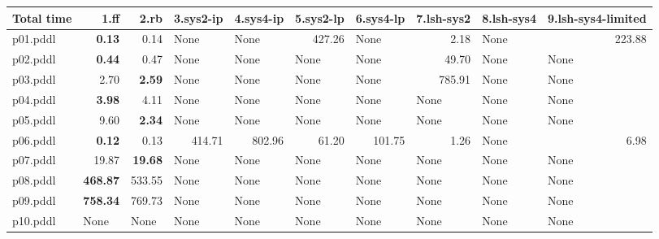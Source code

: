 \documentclass{article}
\begin{document}
\begin{tabular}{@{}lrrrrrrrrr@{}}
Total time & 1.ff & 2.rb & 3.sys2-ip & 4.sys4-ip & 5.sys2-lp & 6.sys4-lp & 7.lsh-sys2 & 8.lsh-sys4 & 9.lsh-sys4-limited \\
\midrule
p01.pddl & \textbf{0.13} & 0.14 & \multicolumn{1}{|l|}{None} & \multicolumn{1}{|l|}{None} & 427.26 & \multicolumn{1}{|l|}{None} & 2.18 & \multicolumn{1}{|l|}{None} & 223.88 \\
p02.pddl & \textbf{0.44} & 0.47 & \multicolumn{1}{|l|}{None} & \multicolumn{1}{|l|}{None} & \multicolumn{1}{|l|}{None} & \multicolumn{1}{|l|}{None} & 49.70 & \multicolumn{1}{|l|}{None} & \multicolumn{1}{|l|}{None} \\
p03.pddl & 2.70 & \textbf{2.59} & \multicolumn{1}{|l|}{None} & \multicolumn{1}{|l|}{None} & \multicolumn{1}{|l|}{None} & \multicolumn{1}{|l|}{None} & 785.91 & \multicolumn{1}{|l|}{None} & \multicolumn{1}{|l|}{None} \\
p04.pddl & \textbf{3.98} & 4.11 & \multicolumn{1}{|l|}{None} & \multicolumn{1}{|l|}{None} & \multicolumn{1}{|l|}{None} & \multicolumn{1}{|l|}{None} & \multicolumn{1}{|l|}{None} & \multicolumn{1}{|l|}{None} & \multicolumn{1}{|l|}{None} \\
p05.pddl & 9.60 & \textbf{2.34} & \multicolumn{1}{|l|}{None} & \multicolumn{1}{|l|}{None} & \multicolumn{1}{|l|}{None} & \multicolumn{1}{|l|}{None} & \multicolumn{1}{|l|}{None} & \multicolumn{1}{|l|}{None} & \multicolumn{1}{|l|}{None} \\
p06.pddl & \textbf{0.12} & 0.13 & 414.71 & 802.96 & 61.20 & 101.75 & 1.26 & \multicolumn{1}{|l|}{None} & 6.98 \\
p07.pddl & 19.87 & \textbf{19.68} & \multicolumn{1}{|l|}{None} & \multicolumn{1}{|l|}{None} & \multicolumn{1}{|l|}{None} & \multicolumn{1}{|l|}{None} & \multicolumn{1}{|l|}{None} & \multicolumn{1}{|l|}{None} & \multicolumn{1}{|l|}{None} \\
p08.pddl & \textbf{468.87} & 533.55 & \multicolumn{1}{|l|}{None} & \multicolumn{1}{|l|}{None} & \multicolumn{1}{|l|}{None} & \multicolumn{1}{|l|}{None} & \multicolumn{1}{|l|}{None} & \multicolumn{1}{|l|}{None} & \multicolumn{1}{|l|}{None} \\
p09.pddl & \textbf{758.34} & 769.73 & \multicolumn{1}{|l|}{None} & \multicolumn{1}{|l|}{None} & \multicolumn{1}{|l|}{None} & \multicolumn{1}{|l|}{None} & \multicolumn{1}{|l|}{None} & \multicolumn{1}{|l|}{None} & \multicolumn{1}{|l|}{None} \\
p10.pddl & \multicolumn{1}{|l|}{None} & \multicolumn{1}{|l|}{None} & \multicolumn{1}{|l|}{None} & \multicolumn{1}{|l|}{None} & \multicolumn{1}{|l|}{None} & \multicolumn{1}{|l|}{None} & \multicolumn{1}{|l|}{None} & \multicolumn{1}{|l|}{None} & \multicolumn{1}{|l|}{None} \\

\end{tabular}
\end{document}
